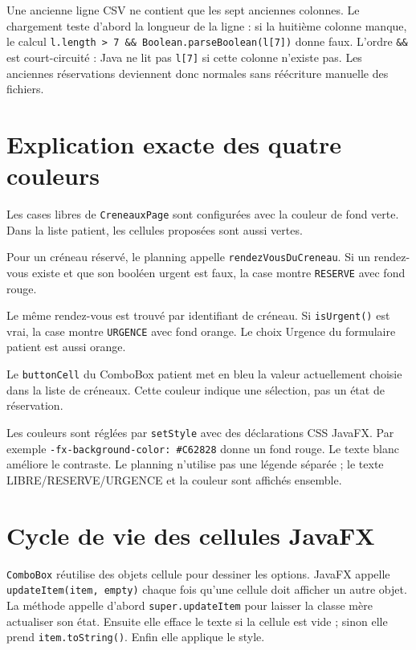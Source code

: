 \documentclass[11pt,a4paper]{report}
\begin{document}
Une ancienne ligne CSV ne contient que les sept anciennes colonnes. Le chargement teste d'abord la longueur de la ligne : si la huitième colonne manque, le calcul \texttt{l.length > 7 \&\& Boolean.parseBoolean(l[7])} donne faux. L'ordre \texttt{\&\&} est court-circuité : Java ne lit pas \texttt{l[7]} si cette colonne n'existe pas. Les anciennes réservations deviennent donc normales sans réécriture manuelle des fichiers.

\section{Explication exacte des quatre couleurs}
\begin{description}[leftmargin=3.1cm,style=nextline]
\item[Vert, disponibilité] Les cases libres de \texttt{CreneauxPage} sont configurées avec la couleur de fond verte. Dans la liste patient, les cellules proposées sont aussi vertes.
\item[Rouge, occupation ordinaire] Pour un créneau réservé, le planning appelle \texttt{rendezVousDuCreneau}. Si un rendez-vous existe et que son booléen urgent est faux, la case montre \texttt{RESERVE} avec fond rouge.
\item[Orange, urgence] Le même rendez-vous est trouvé par identifiant de créneau. Si \texttt{isUrgent()} est vrai, la case montre \texttt{URGENCE} avec fond orange. Le choix Urgence du formulaire patient est aussi orange.
\item[Bleu, choix courant] Le \texttt{buttonCell} du ComboBox patient met en bleu la valeur actuellement choisie dans la liste de créneaux. Cette couleur indique une sélection, pas un état de réservation.
\end{description}
Les couleurs sont réglées par \texttt{setStyle} avec des déclarations CSS JavaFX. Par exemple \texttt{-fx-background-color: \#C62828} donne un fond rouge. Le texte blanc améliore le contraste. Le planning n'utilise pas une légende séparée ; le texte LIBRE/RESERVE/URGENCE et la couleur sont affichés ensemble.

\section{Cycle de vie des cellules JavaFX}
\texttt{ComboBox} réutilise des objets cellule pour dessiner les options. JavaFX appelle \texttt{updateItem(item, empty)} chaque fois qu'une cellule doit afficher un autre objet. La méthode appelle d'abord \texttt{super.updateItem} pour laisser la classe mère actualiser son état. Ensuite elle efface le texte si la cellule est vide ; sinon elle prend \texttt{item.toString()}. Enfin elle applique le style.
\end{document}
